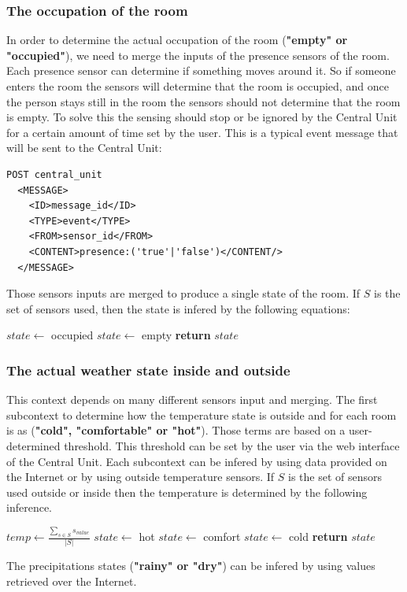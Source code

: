 \documentclass{acm_proc_article-sp}
\begin{document}
 \subsubsection*{The occupation of the room}
 In order to determine the actual occupation of the room (\textbf{"empty" or "occupied"}), we need to merge the inputs of the presence sensors of the room.
 Each presence sensor can determine if something moves around it. 
 So if someone enters the room the sensors will determine that the room is occupied, and once the person stays still in the room the sensors should not determine that the room is empty. 
 To solve this the sensing should stop or be ignored by the Central Unit for a certain amount of time set by the user.
 This is a typical event message that will be sent to the Central Unit:
 \begin{verbatim}
POST central_unit 
  <MESSAGE>
    <ID>message_id</ID>
    <TYPE>event</TYPE>
    <FROM>sensor_id</FROM>
    <CONTENT>presence:('true'|'false')</CONTENT/>
  </MESSAGE> 
\end{verbatim}
Those sensors inputs are merged to produce a single state of the room.
If $S$ is the set of sensors used, then the state is infered by the following equations:
 \begin{description}
 \begin{algorithm}
  \begin{algorithmic}
      \State $state\gets$ occupied
    \Else
      \State $state\gets$ empty
  \EndIf
  \State \textbf{return} $state$
  \end{algorithmic}
  \end{algorithm}
 \end{description}
 \subsubsection*{The actual weather state inside and outside}
 This context depends on many different sensors input and merging.
 The first subcontext to determine how the temperature state is outside and for each room is as (\textbf{"cold", "comfortable" or "hot"}). 
 Those terms are based on a user-determined threshold. This threshold can be set by the user via the web interface of the Central Unit.
 Each subcontext can be infered by using data provided on the Internet or by using outside temperature sensors.
 If $S$ is the set of sensors used outside or inside then the temperature is determined by the following inference.
 \begin{description}
 \begin{algorithm}
  \begin{algorithmic}
  \State $temp\gets \frac{\underset{s \in S}{\sum} s_{value}}{|S|}$
    \State $state\gets$ hot
    \State $state\gets$ comfort
    \State $state\gets$ cold
   \EndIf
  \State \textbf{return} $state$
  \end{algorithmic}
  \end{algorithm}
  \end{description}
 The precipitations states (\textbf{"rainy" or "dry"}) can be infered by using values retrieved over the Internet.
\end{document}
